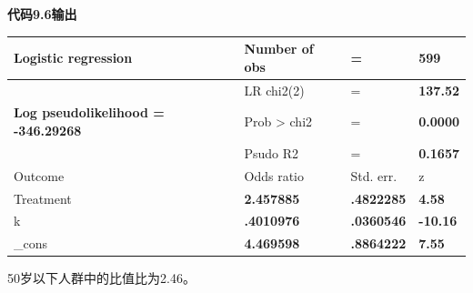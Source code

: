 \documentclass[
  chinese-hans,
  letterpaper,
  DIV=11,
  numbers=noendperiod]{scrreprt}
\newcounter{none} %
\begin{document}
\begin{tcolorbox}[enhanced jigsaw, arc=.35mm, bottomrule=.15mm, breakable, colback=white, colframe=quarto-callout-note-color-frame, left=2mm, leftrule=.75mm, opacityback=0, rightrule=.15mm, toprule=.15mm]

\vspace{-3mm}\textbf{代码9.6输出}\vspace{3mm}

{\def\LTcaptype{none} %
\begin{longtable}[]{@{}
  >{\centering\arraybackslash}p{}
  >{\raggedright\arraybackslash}p{}
  >{\centering\arraybackslash}p{}
  >{\centering\arraybackslash}p{}@{}}
\toprule\noalign{}
\begin{minipage}[b]{\linewidth}\centering
Logistic regression
\end{minipage} & \begin{minipage}[b]{\linewidth}\raggedright
Number of obs
\end{minipage} & \begin{minipage}[b]{\linewidth}\centering
=
\end{minipage} & \begin{minipage}[b]{\linewidth}\centering
\textbf{599}
\end{minipage} \\
\midrule\noalign{}
\endhead
\bottomrule\noalign{}
\endlastfoot
& LR chi2(2) & = & \textbf{137.52} \\
\textbf{Log pseudolikelihood = -346.29268} & Prob \textgreater{} chi2 &
= & \textbf{0.0000} \\
& Psudo R2 & = & \textbf{0.1657} \\
Outcome & Odds ratio & Std. err. & z \\
Treatment & \textbf{2.457885} & \textbf{.4822285} & \textbf{4.58} \\
k & \textbf{.4010976} & \textbf{.0360546} & \textbf{-10.16} \\
\_cons & \textbf{4.469598} & \textbf{.8864222} & \textbf{7.55} \\
\end{longtable}
}

\end{tcolorbox}

50岁以下人群中的比值比为2.46。
\end{document}
